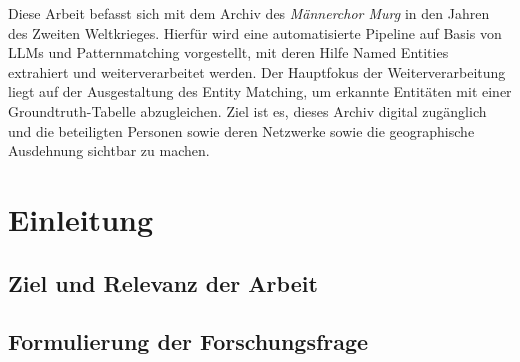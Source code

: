 \documentclass[12pt, a4paper, ngerman, bidi=default]{article}
\renewcommand*\contentsname{Inhaltsverzeichnis}
\newcommand\contentsname{Inhaltsverzeichnis}
\begin{document}
\newpage 
Diese Arbeit befasst sich mit dem Archiv des \textit{Männerchor Murg} in den Jahren des Zweiten Weltkrieges. 
Hierfür wird eine automatisierte Pipeline auf Basis von LLMs und Patternmatching vorgestellt, mit deren Hilfe Named Entities extrahiert und weiterverarbeitet werden. Der Hauptfokus der Weiterverarbeitung liegt auf der Ausgestaltung des Entity Matching, um erkannte Entitäten mit einer Groundtruth-Tabelle abzugleichen. 
Ziel ist es, dieses Archiv digital zugänglich und die beteiligten Personen sowie deren Netzwerke sowie die geographische Ausdehnung sichtbar zu machen.






\newpage
\renewcommand*\contentsname{Inhaltsverzeichnis}%
{
\hypersetup{linkcolor=}
\setcounter{tocdepth}{4}%
\tableofcontents
}


\newpage
\section{Einleitung}
\subsection{Ziel und Relevanz der Arbeit}
\subsection{Formulierung der Forschungsfrage}
\end{document}
